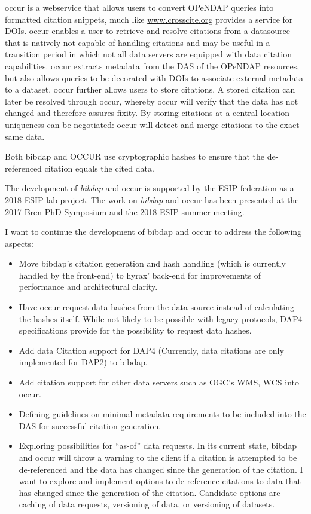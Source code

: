 \documentclass[a4paper,10pt]{article}
\begin{document}
\Gls{occur} is a webservice that allows users to convert \gls{OPeNDAP} queries into formatted citation snippets, much like \url{www.crosscite.org} provides a service for \glspl{DOI}.
\gls{occur} enables a user to retrieve and resolve citations from a datasource that is natively not capable of handling citations and may be useful in a transition period in which not all data servers are equipped with data citation capabilities. \gls{occur} extracts metadata from the \gls{DAS} of the \gls{OPeNDAP} resources, but also allows queries to be decorated with \glspl{DOI} to associate external metadata to a dataset. \gls{occur} further allows users to store citations. A stored citation can later be resolved through \gls{occur}, whereby \gls{occur} will verify that the data has not changed and therefore assures fixity. By storing citations at a central location uniqueness can be negotiated: \gls{occur} will detect and merge citations to the exact same data.

Both bibdap and OCCUR use cryptographic hashes to ensure that the de-referenced citation equals the cited data.

The development of \textit{bibdap} and \gls{occur} is supported by the \gls{ESIP} federation as a 2018 \gls{ESIP} lab project. The work on \textit{bibdap} and \gls{occur} has been presented at the 2017 Bren PhD Symposium and the 2018 \gls{ESIP} summer meeting.


I want to continue the development of bibdap and occur to address the following aspects:

\begin{itemize} 
 \item Move bibdap's citation generation and hash handling (which is currently handled by the front-end) to hyrax' back-end for improvements of performance and architectural clarity.
 \item Have occur request data hashes from the data source instead of calculating the hashes itself. While not likely to be possible with legacy protocols, DAP4 specifications provide for the possibility to request data hashes. 
 \item Add data Citation support for DAP4 (Currently, data citations are only implemented for DAP2) to bibdap.
 \item Add citation support for other data servers such as \gls{OGC}'s \gls{WMS}, \gls{WCS} into \gls{occur}.  
 \item Defining guidelines on minimal metadata requirements to be included into the \gls{DAS} for successful citation generation.
 \item Exploring possibilities for ``as-of'' data requests. In its current state, bibdap and occur will throw a warning to the client if a citation is attempted to be de-referenced and the data has changed since the generation of the citation. I want to explore and implement options to de-reference citations to data that has changed since the generation of the citation. Candidate options are caching of data requests, versioning of data, or versioning of datasets.
\end{itemize}
\end{document}

